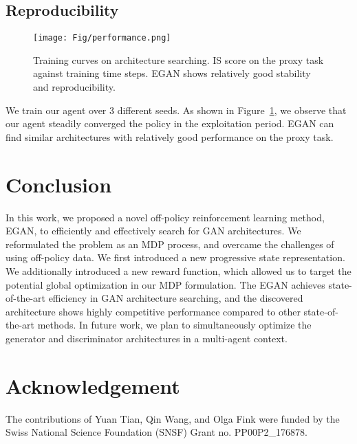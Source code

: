 \documentclass[runningheads]{llncs}
\begin{document}
\subsection{Reproducibility}
\begin{figure}[t!]
    \centering
    \texttt{[image: Fig/performance.png]}
    \caption{Training curves on architecture searching.  IS score on the proxy task against training time steps. EGAN shows relatively good stability and reproducibility.}
\label{fig:reproducibility}
\end{figure}
We train our agent over 3 different seeds. As shown in Figure~\ref{fig:reproducibility}, we observe that our agent steadily  converged the policy in the exploitation period. EGAN can find similar architectures with relatively good performance on the proxy task. 

\section{Conclusion}
In this work, we proposed a novel off-policy reinforcement learning method, EGAN, to efficiently and effectively search for GAN architectures. We reformulated the problem as an MDP process, and overcame the challenges of using off-policy data. We first introduced a new progressive state representation. We additionally introduced a new reward function, which allowed us to target the potential global optimization in our MDP formulation. The EGAN achieves state-of-the-art efficiency in GAN architecture searching, and the discovered architecture shows highly competitive performance compared to other state-of-the-art methods. In future work, we plan to simultaneously optimize the generator and discriminator architectures in a multi-agent context.


\clearpage
\section*{Acknowledgement}
The contributions of Yuan Tian, Qin Wang, and Olga Fink were funded by the Swiss National Science Foundation (SNSF) Grant no. PP00P2\_176878.



\end{document}

